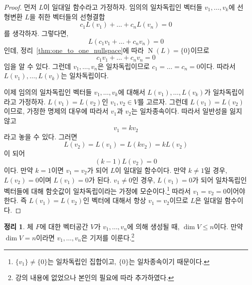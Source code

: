 \documentclass[unfonts,oneside,a4paper]{oblivoir}
\theoremstyle{definition}
\theoremstyle{theorem}
\newtheorem{theorem}[definition]{정리}
\theoremstyle{theorem}
\theoremstyle{remark}
\theoremstyle{remark}
\theoremstyle{remark}
\theoremstyle{remark}
\renewcommand{\vec}[1]{\bm{\mathit{#1}}}
\newcommand{\vecz}{\bm{\mathrm{0}}}
\DeclareMathOperator{\Null}{N}
\begin{document}
\begin{proof}
    먼저 $L$이 일대일 함수라고 가정하자.
    임의의 일차독립인 벡터들 $\vec v_1, \dots, \vec v_k$에 선형변환 $L$을 취한 벡터들의 선형결합
    \begin{equation*}
        c_1 L(\vec v_1) + \dots + c_n L(\vec v_n) = \vecz
    \end{equation*}
    를 생각하자.
    그렇다면,
    \begin{equation*}
        L(c_1 \vec v_1 + \dots + c_n \vec v_n) = \vecz
    \end{equation*}
    인데, 정리~\ref{thm:one_to_one_nullspace}에 따라 $\Null(L) = \{\vecz\}$이므로
    \begin{equation*}
        c_1 \vec v_1 + \dots + c_n \vec v_n = \vecz
    \end{equation*}
    임을 알 수 있다.
    그런데 $\vec v_1, \dots, \vec v_n$은 일차독립이므로 $c_1 = \dots = c_n = 0$이다.
    따라서 $L(\vec v_1), \dots, L(\vec v_k)$는 일차독립이다.

    이제 임의의 일차독립인 벡터들 $\vec v_1, \dots, \vec v_k$에 대해서 $L(\vec v_1), \dots, L(\vec v_k)$가 일차독립이라고 가정하자.
    $L(\vec v_1) = L(\vec v_2)$인 $\vec v_1, \vec v_2 \in V$를 고르자.
    그런데 $L(\vec v_1) = L(\vec v_2)$이므로, 가정한 명제의 대우에 따라서 $\vec v_1$과 $\vec v_2$는 일차종속이다.
    따라서 일반성을 잃지 않고
    \begin{equation*}
        \vec v_1 = k\vec v_2
    \end{equation*}
    라고 놓을 수 있다.
    그러면
    \begin{equation*}
        L(\vec v_2) = L(\vec v_1) = L(k \vec v_2) = k L(\vec v_2)
    \end{equation*}
    이 되어
    \begin{equation*}
        (k - 1) L(\vec v_2) = \vecz
    \end{equation*}
    이다.
    만약 $k = 1$이면 $\vec v_1 = \vec v_2$가 되어 $L$이 일대일 함수이다.
    만약 $k \neq 1$일 경우, $L(\vec v_2) = \vecz$이며 $L(\vec v_1) = \vecz$가 된다.
    $\vec v_1 \neq \vecz$인 경우, $L(\vec v_1) = \vecz$가 되어 일차독립인 벡터들에 대해 함숫값이 일차독립이라는 가정에 모순이다.\footnote{$\{\vec v_1\} \neq \{\vecz\}$는 일차독립인 집합이고, $\{\vecz\}$는 일차종속이기 때문이다.}
    따라서 $\vec v_1 = \vec v_2 = \vecz$이어야 한다.
    즉 $L(\vec v_1) = L(\vec v_2)$인 벡터에 대해서 항상 $\vec v_1 = \vec v_2$이므로 $L$은 일대일 함수이다.
\end{proof}

\begin{theorem} \label{thm:basis_span}
    체 $F$에 대한 벡터공간 $V$가 $\vec v_1, \dots, \vec v_n$에 의해 생성될 때, $\dim V \leq n$이다.
    만약 $\dim V = n$이라면 $\vec v_1, \dots, \vec v_n$은 기저를 이룬다.\footnote{강의 내용에 없었으나 본인의 필요에 따라 추가하였다.}
\end{theorem}
\end{document}
